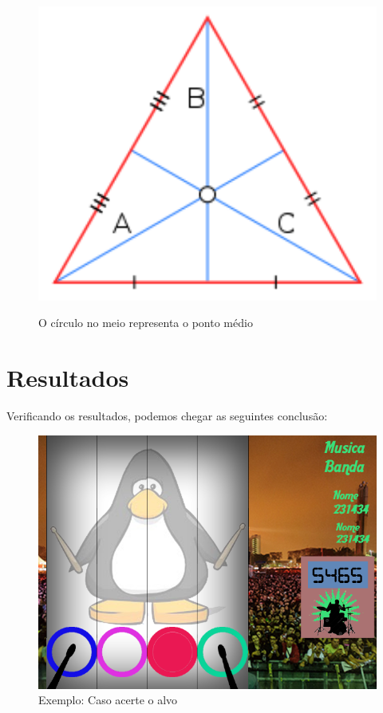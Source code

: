 \documentclass{sciposter}
\begin{document}
\begin{multicols}{3}
\begin{figure}[!htb]
\caption{O círculo no meio representa o ponto médio}
\includegraphics[width=15cm]{cent.png}
\label{Ponto médio}
\end{figure}


\section{Resultados }

Verificando os resultados, podemos chegar as seguintes conclusão:

\begin{figure}[!htb]
\centering
\includegraphics[scale=2.3]{AccertCase.png}
\caption{Exemplo: Caso acerte o alvo}
\end{figure}


\end{multicols}
\end{document}
